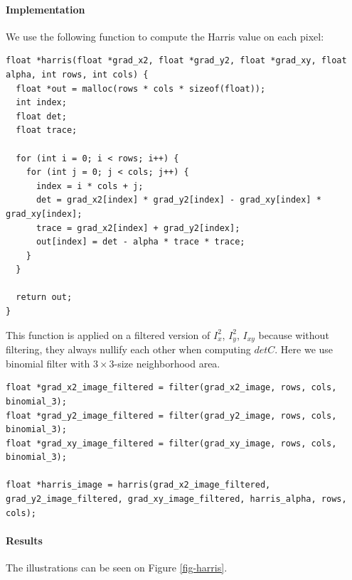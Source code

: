 \documentclass[a4paper, 10pt]{article}
\begin{document}
\paragraph{Implementation} We use the following function to compute the Harris value on each pixel:
\begin{lstlisting}[frame=single]
float *harris(float *grad_x2, float *grad_y2, float *grad_xy, float alpha, int rows, int cols) {
  float *out = malloc(rows * cols * sizeof(float));
  int index;
  float det;
  float trace;

  for (int i = 0; i < rows; i++) {
    for (int j = 0; j < cols; j++) {
      index = i * cols + j;
      det = grad_x2[index] * grad_y2[index] - grad_xy[index] * grad_xy[index];
      trace = grad_x2[index] + grad_y2[index];
      out[index] = det - alpha * trace * trace;
    }
  }

  return out;
}
\end{lstlisting}

This function is applied on a filtered version of $I^2_x$, $I^2_y$, $I_{xy}$ because without filtering, they always nullify each other when computing $detC$. Here we use binomial filter with $3\times3$-size neighborhood area.

\begin{lstlisting}[frame=single]
float *grad_x2_image_filtered = filter(grad_x2_image, rows, cols, binomial_3);
float *grad_y2_image_filtered = filter(grad_y2_image, rows, cols, binomial_3);
float *grad_xy_image_filtered = filter(grad_xy_image, rows, cols, binomial_3);

float *harris_image = harris(grad_x2_image_filtered, grad_y2_image_filtered, grad_xy_image_filtered, harris_alpha, rows, cols);
\end{lstlisting}


\paragraph{Results} The illustrations can be seen on Figure \ref{fig-harris}.
\end{document}
